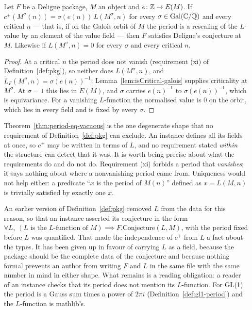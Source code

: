 \begin{theorem}
  \label{thm:period-eq-vacuous}
  \leanok
  Let $F$ be a Deligne package, $M$ an object and $e \colon \mathbb{Z} \to E(M)$.
  If $c^{+}(M^{\sigma}(n)) = \sigma(e(n))\,L(M^{\sigma},n)$ for every
  $\sigma \in \operatorname{Gal}(\mathbb{C}/\mathbb{Q})$ and every critical $n$ --- that is, if on the Galois
  orbit of $M$ the period is a rescaling of the $L$-value by an element of the value field ---
  then $F$ satisfies Deligne's conjecture at $M$. Likewise if $L(M^{\sigma},n) = 0$ for every
  $\sigma$ and every critical $n$.
\end{theorem}
\begin{proof}
  \leanok
  At a critical $n$ the period does not vanish (requirement (xi) of Definition~\ref{def:pkg}),
  so neither does $L(M^{\sigma},n)$, and $\widetilde{L}_{F}(M^{\sigma},n) = \sigma(e(n))^{-1}$;
  Lemma~\ref{lem:isCritical-galois} supplies criticality at $M^{\sigma}$. At $\sigma = 1$ this
  lies in $E(M)$, and $\sigma$ carries $e(n)^{-1}$ to $\sigma(e(n))^{-1}$, which is equivariance.
  For a vanishing $L$-function the normalised value is $0$ on the orbit, which lies in every
  field and is fixed by every $\sigma$.
\end{proof}

Theorem~\ref{thm:period-eq-vacuous} is the one degenerate shape that no requirement of
Definition~\ref{def:pkg} can exclude. An instance defines all its fields at once, so $c^{+}$ may
be written in terms of $L$, and no requirement stated \emph{within} the structure can detect
that it was. It is worth being precise about what the requirements do and do not do.
Requirement (xi) forbids a period that \emph{vanishes}; it says nothing about where a nonvanishing
period came from. Uniqueness would not help either: a predicate ``$x$ is the period of $M(n)$''
defined as $x = L(M,n)$ is trivially satisfied by exactly one $x$.

An earlier version of Definition~\ref{def:pkg} removed $L$ from the data for this reason, so
that an instance asserted its conjecture in the form
$\forall L,\ (\text{$L$ is the $L$-function of $M$}) \implies F.\mathrm{Conjecture}(L,M)$,
with the period fixed before $L$ was quantified. That made the independence of $c^{+}$ from $L$
a fact about the types. It has been given up in favour of carrying $L$ as a field, because the
package should be the complete data of the conjecture and because nothing formal prevents an
author from writing $F$ and $L$ in the same file with the same number in mind in either shape.
What remains is a reading obligation: a reader of an instance checks that its period does not
mention its $L$-function. For GL(1) the period is a Gauss sum times a power of $2\pi i$
(Definition~\ref{def:gl1-period}) and the $L$-function is mathlib's.

